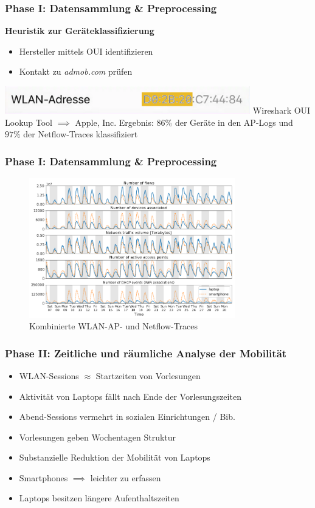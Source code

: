 \documentclass{beamer}
\begin{document}
\begin{frame}
  \frametitle{Phase I: Datensammlung \& Preprocessing}
  \textbf{Heuristik zur Geräteklassifizierung}
  \begin{itemize}
    \item Hersteller mittels OUI identifizieren
    \item Kontakt zu \textit{admob.com} prüfen
  \end{itemize}
  \includegraphics[width=0.8\textwidth]{images/MAC_iPhone.png}\newline
  Wireshark OUI Lookup Tool $\implies$ Apple, Inc.\newline\newline
  Ergebnis: $86\%$ der Geräte in den AP-Logs und $97\%$ der Netflow-Traces klassifiziert
\end{frame}

\begin{frame}
  \frametitle{Phase I: Datensammlung \& Preprocessing}
  \begin{figure}
    \centering
    \includegraphics[width=0.8\textwidth]{images/traces.png}
    \caption*{Kombinierte WLAN-AP- und Netflow-Traces}
  \end{figure}  
\end{frame}

\begin{frame}
  \frametitle{Phase II: Zeitliche und räumliche Analyse der Mobilität}
  \begin{itemize}
    \item WLAN-Sessions $\approx$ Startzeiten von Vorlesungen
    \item Aktivität von Laptops fällt nach Ende der Vorlesungszeiten
    \item Abend-Sessions vermehrt in sozialen Einrichtungen / Bib.
    \item Vorlesungen geben Wochentagen Struktur
    \item Substanzielle Reduktion der Mobilität von Laptops
    \item Smartphones  $\implies$ leichter zu erfassen
    \item Laptops besitzen längere Aufenthaltszeiten 
  \end{itemize}
\end{frame}
\end{document}
